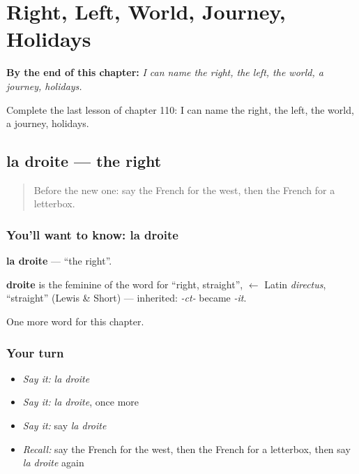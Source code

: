 
\chapter{Right, Left, World, Journey, Holidays}
\label{ch:fr-right-left-world-journey-holidays}

\begin{chapteropening}
\textbf{By the end of this chapter:} \emph{I can name the right, the left, the world, a journey, holidays.}

Complete the last lesson of chapter 110: I can name the right, the left, the world, a journey, holidays.
\end{chapteropening}

\section[la droite]{la droite — the right}

\label{lesson:FR-C110-droite}



\begin{quote}
Before the new one: say the French for the west, then the French for a letterbox.
\end{quote}

\subsection*{You'll want to know: la droite}
\textbf{la droite} — \textquotedblleft{}the right\textquotedblright{}.

\begin{cousinweb}
\textbf{droite} is the feminine of the word for \textquotedblleft{}right, straight\textquotedblright{}, $\leftarrow$ Latin \emph{directus}, \textquotedblleft{}straight\textquotedblright{} (Lewis \& Short) — inherited: \emph{-ct-} became \emph{-it}.
\end{cousinweb}

\begin{grammarlens}[title={What you've built}]
One more word for this chapter.
\end{grammarlens}

\subsection*{Your turn}
\begin{itemize}
\raggedright
  \item \emph{Say it:} \emph{la droite}
  \item \emph{Say it:} \emph{la droite}, once more
  \item \emph{Say it:} say \emph{la droite}
  \item \emph{Recall:} say the French for the west, then the French for a letterbox, then say \emph{la droite} again
\end{itemize}

